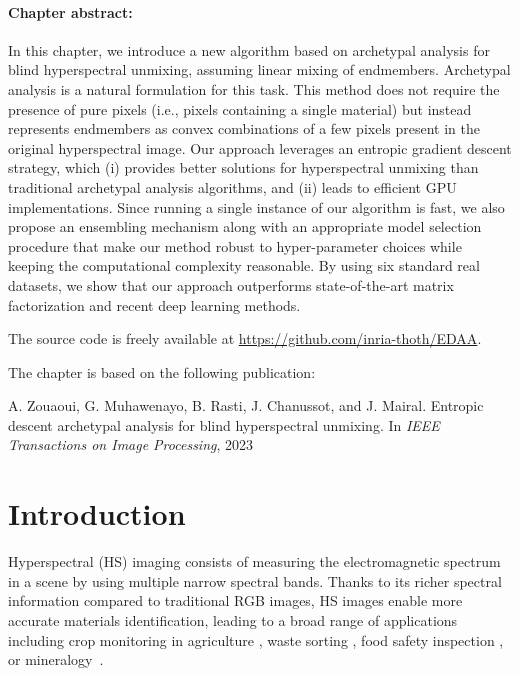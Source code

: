 \begin{tcolorbox}[colback=gray!5!white,colframe=gray!75!black]

        \paragraph{Chapter abstract:}
        In this chapter, we introduce a new algorithm based on archetypal analysis for blind hyperspectral unmixing, assuming linear mixing of endmembers.
        Archetypal analysis is a natural formulation for this task.
        This method does not require the presence of pure pixels (i.e., pixels containing a single material) but instead represents endmembers as convex combinations of a few pixels present in the original hyperspectral image.
        Our approach leverages an entropic gradient descent strategy, which (i) provides better solutions for hyperspectral unmixing than traditional archetypal analysis algorithms, and (ii) leads to efficient GPU implementations.
        Since running a single instance of our algorithm is fast, we also propose an ensembling mechanism along with an appropriate model selection procedure that make our method robust to hyper-parameter choices while keeping the computational complexity reasonable.
        By using six standard real datasets, we show that our approach outperforms state-of-the-art matrix factorization and recent deep learning methods.

        \vspace{1em}
        The source code is freely available at \href{https://github.com/inria-thoth/EDAA}{https://github.com/inria-thoth/EDAA}.
        
        \vspace{1em}
        The chapter is based on the following publication:

        \vspace{0.5em}

        A. Zouaoui, G. Muhawenayo, B. Rasti, J. Chanussot, and J. Mairal. Entropic descent archetypal analysis for blind hyperspectral unmixing. In \emph{IEEE Transactions on Image Processing}, 2023
    \end{tcolorbox}

\newpage
\minitoc

\section{Introduction}

Hyperspectral (HS) imaging  \cite{landgrebe_hyperspectral_2002, plaza_recent_2009, schaepman_earth_2009, goetz_imaging_1985, green_imaging_1998} consists of measuring the electromagnetic spectrum in a scene by using multiple narrow spectral bands.
Thanks to its richer spectral information compared to traditional RGB images, HS images enable more accurate materials identification, leading to a broad range of applications including crop monitoring in agriculture \cite{adao_hyperspectral_2017}, waste sorting \cite{karaca_automatic_2013}, food safety inspection \cite{gowen_hyperspectral_2007}, or mineralogy~\cite{fox_applications_2017}.

